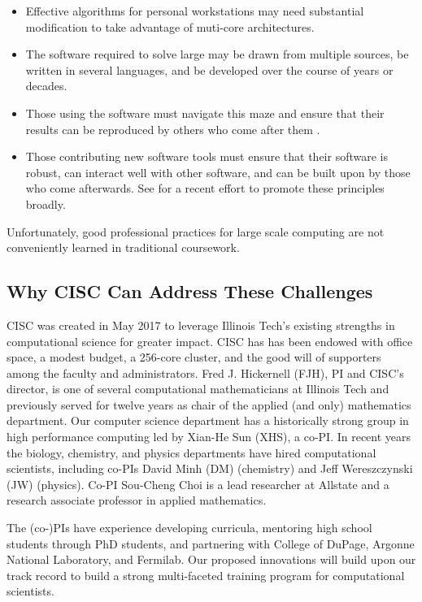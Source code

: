 \documentclass[11pt]{NSFamsart}
\begin{document}
\begin{itemize}

\item Effective algorithms for personal workstations may need substantial modification to take advantage of muti-core architectures.

\item The software required to solve large may be drawn from multiple sources, be written in several languages, and be developed over the course of years or decades.  


\item Those using the software must navigate this maze and ensure that their results can be reproduced by others who come after them \cite{Pen11}.  

\item Those contributing new software tools must ensure that their software is robust, can interact well with other software, and can be built upon by those who come afterwards.  See \cite{BSS18} for a recent effort to promote these principles broadly.

\end{itemize}
Unfortunately, good professional practices for large scale computing are not conveniently learned in traditional coursework.

\subsection{Why CISC Can Address These Challenges}
CISC was created in May 2017 to leverage Illinois Tech’s existing strengths in computational science for greater impact.  CISC has has been endowed with office space, a modest budget, a 256-core cluster, and the good will of supporters among the faculty and administrators.  Fred J. Hickernell (FJH), PI and CISC’s director, is one of several computational mathematicians at Illinois Tech and previously served for twelve years as chair of the applied (and only) mathematics department.  Our computer science department has a historically strong group in high performance computing led by Xian-He Sun (XHS), a co-PI.  In recent years the biology, chemistry, and physics departments have hired computational scientists, including co-PIs David Minh (DM) (chemistry) and Jeff Wereszczynski (JW) (physics).  Co-PI Sou-Cheng Choi is a lead researcher at Allstate and a research associate professor in applied mathematics.

The (co-)PIs have experience developing curricula, mentoring high school students through PhD students, and partnering with College of DuPage, Argonne National Laboratory, and Fermilab.  Our proposed innovations will build upon our track record to build a strong multi-faceted training program for computational scientists.
\end{document}
